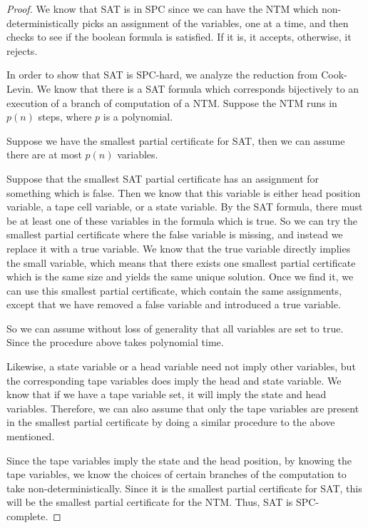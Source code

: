 \documentclass[runningheads,a4paper]{llncs}
\begin{document}
\begin{proof}
We know that SAT is in SPC since we can have the NTM which non-deterministically picks an assignment of the variables, one at a time, and then checks to see if the boolean formula is satisfied. If it is, it accepts, otherwise, it rejects. 

In order to show that SAT is SPC-hard, we analyze the reduction from Cook-Levin. We know that there is a SAT formula which corresponds bijectively to an execution of a branch of computation of a NTM. Suppose the NTM runs in $p(n)$ steps, where $p$ is a polynomial.

Suppose we have the smallest partial certificate for SAT, then we can assume there are at most $p(n)$ variables. 

Suppose that the smallest SAT partial certificate has an assignment for something which is false. Then we know that this variable is either head position variable, a tape cell variable, or a state variable. By the SAT formula, there must be at least one of these variables in the formula which is true. So we can try the smallest partial certificate where the false variable is missing, and instead we replace it with a true variable. We know that the true variable directly implies the small variable, which means that there exists one smallest partial certificate which is the same size and yields the same unique solution. Once we find it, we can use this smallest partial certificate, which contain the same assignments, except that we have removed a false variable and introduced a true variable. 

So we can assume without loss of generality that all variables are set to true. Since the procedure above takes polynomial time.

Likewise, a state variable or a head variable need not imply other variables, but the corresponding tape variables does imply the head and state variable. We know that if we have a tape variable set, it will imply the state and head variables. Therefore, we can also assume that only the tape variables are present in the smallest partial certificate by doing a similar procedure to the above mentioned.

Since the tape variables imply the state and the head position, by knowing the tape variables, we know the choices of certain branches of the computation to take non-deterministically. Since it is the smallest partial certificate for SAT, this will be the smallest partial certificate for the NTM. Thus, SAT is SPC-complete.
\end{proof}
\end{document}

